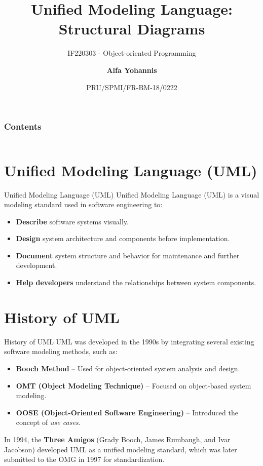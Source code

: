 \documentclass[aspectratio=169, table]{beamer}
\subtitle{IF220303 - Object-oriented Programming}
\title{\LARGE{Unified Modeling Language:}\\\LARGE{Structural Diagrams}\vspace{20pt}}
\date[Serial]{\scriptsize {PRU/SPMI/FR-BM-18/0222}}
\author[Pradita]{\small {\textbf{Alfa Yohannis}}}
\begin{document}
\frame{\titlepage}

\begin{frame}[fragile]
\frametitle{Contents}
\vspace{10pt}
\begin{columns}[t]
	\tableofcontents[sections={1-5}]
	
	\tableofcontents[sections={6-10}]
\end{columns}
\end{frame}

\section{Unified Modeling Language (UML)}

\begin{frame}{Unified Modeling Language (UML)}
	\vspace{20pt}
	Unified Modeling Language (UML) is a visual modeling standard used in software engineering to:
	\begin{itemize}
		\item \textbf{Describe} software systems visually.
		\item \textbf{Design} system architecture and components before implementation.
		\item \textbf{Document} system structure and behavior for maintenance and further development.
		\item \textbf{Help developers} understand the relationships between system components.
	\end{itemize}
\end{frame}

\section{History of UML}

\begin{frame}{History of UML}
	\vspace{20pt}
	UML was developed in the 1990s by integrating several existing software modeling methods, such as:
	\begin{itemize}
		\item \textbf{Booch Method} – Used for object-oriented system analysis and design.
		\item \textbf{OMT (Object Modeling Technique)} – Focused on object-based system modeling.
		\item \textbf{OOSE (Object-Oriented Software Engineering)} – Introduced the concept of \textit{use cases}.
	\end{itemize}
	In 1994, the \textbf{Three Amigos} (Grady Booch, James Rumbaugh, and Ivar Jacobson) developed UML as a unified modeling standard, which was later submitted to the OMG in 1997 for standardization.
\end{frame}
\end{document}

